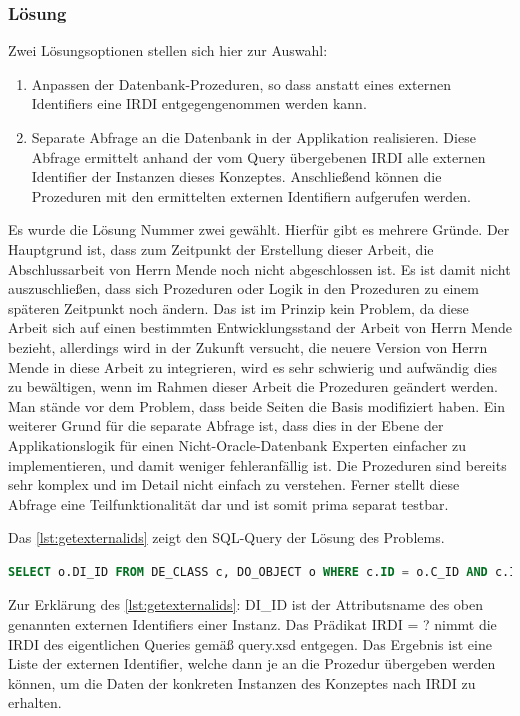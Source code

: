 \subsubsection{Lösung}

Zwei Lösungsoptionen stellen sich hier zur Auswahl:
\begin{enumerate}
\item Anpassen der Datenbank-Prozeduren, so dass anstatt eines externen Identifiers eine \gls{IRDI} entgegengenommen werden kann.
\item Separate Abfrage an die Datenbank in der Applikation realisieren. Diese Abfrage ermittelt anhand der vom Query übergebenen \gls{IRDI} alle externen Identifier der Instanzen dieses Konzeptes. Anschließend können die Prozeduren mit den ermittelten externen Identifiern aufgerufen werden.   
\end{enumerate}

Es wurde die Lösung Nummer zwei gewählt. Hierfür gibt es mehrere Gründe. Der Hauptgrund ist, dass zum Zeitpunkt der Erstellung dieser Arbeit, die Abschlussarbeit von Herrn Mende noch nicht abgeschlossen ist. Es ist damit nicht auszuschließen, dass sich Prozeduren oder Logik in den Prozeduren zu einem späteren Zeitpunkt noch ändern. Das ist im Prinzip kein Problem, da diese Arbeit sich auf einen bestimmten Entwicklungsstand der Arbeit von Herrn Mende bezieht, allerdings wird in der Zukunft versucht, die neuere Version von Herrn Mende in diese Arbeit zu integrieren, wird es sehr schwierig und aufwändig dies zu bewältigen, wenn im Rahmen dieser Arbeit die Prozeduren geändert werden. Man stände vor dem Problem, dass beide Seiten die Basis modifiziert haben. 
Ein weiterer Grund für die separate Abfrage ist, dass dies in der Ebene der Applikationslogik für einen Nicht-\gls{Oracle}-Datenbank Experten einfacher zu implementieren, und damit weniger fehleranfällig ist. Die Prozeduren sind bereits sehr komplex und im Detail nicht einfach zu verstehen. 
Ferner stellt diese Abfrage eine Teilfunktionalität dar und ist somit prima separat testbar.  

Das \autoref{lst:getexternalids} zeigt den SQL-Query der Lösung des Problems.

\begin{lstlisting}[caption=SQL Query - Externe IDs abfragen, language=SQL, label=lst:getexternalids]
SELECT o.DI_ID FROM DE_CLASS c, DO_OBJECT o WHERE c.ID = o.C_ID AND c.IRDI = ?
\end{lstlisting}

Zur Erklärung des \autoref{lst:getexternalids}:
DI\_ID ist der Attributsname des oben genannten externen Identifiers einer Instanz. Das Prädikat \gls{IRDI} = ? nimmt die \gls{IRDI} des eigentlichen Queries gemäß query.xsd entgegen. Das Ergebnis ist eine Liste der externen Identifier, welche dann je an die Prozedur übergeben werden können, um die Daten der konkreten Instanzen des Konzeptes nach \gls{IRDI} zu erhalten. 

